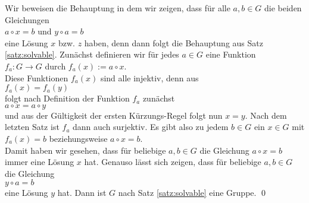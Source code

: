 \proof Wir beweisen die Behauptung in dem wir zeigen, dass für alle $a,b \in G$ die beiden Gleichungen
\\[0.2cm]
\hspace*{1.3cm} $a \circ x = b$ \quad und \quad $y \circ a = b$
\\[0.2cm]
eine Lösung $x$ bzw. $z$ haben, denn dann folgt die Behauptung aus Satz \ref{satz:solvable}.  Zunächst definieren wir für
jedes $a \in G$ eine Funktion
\\[0.2cm]
\hspace*{1.3cm} $f_a: G \rightarrow G$ \quad durch \quad $f_a(x) := a \circ x$.
\\[0.2cm]
Diese Funktionen $f_a(x)$ sind alle injektiv, denn aus
\\[0.2cm]
\hspace*{1.3cm} $f_a(x) = f_a(y)$
\\[0.2cm]
folgt nach Definition der Funktion $f_a$ zunächst
\\[0.2cm]
\hspace*{1.3cm} $a \circ x = a \circ y$
\\[0.2cm]
und aus der Gültigkeit der ersten Kürzungs-Regel folgt nun $x = y$.  Nach dem letzten Satz ist $f_a$ dann
auch surjektiv.  Es gibt also zu jedem $b \in G$ ein $x \in G$ mit
\\[0.2cm]
\hspace*{1.3cm} $f_a(x) = b$ \quad beziehungsweise \quad $a \circ x = b$.
\\[0.2cm]
Damit haben wir gesehen, dass für beliebige $a,b \in G$ die Gleichung $a \circ x = b$ immer eine Lösung
$x$ hat.  Genauso lässt sich  zeigen, dass für beliebige $a,b \in G$ die Gleichung
\\[0.2cm]
\hspace*{1.3cm}
$y \circ a = b$
\\[0.2cm]
eine Lösung $y$ hat.  Dann ist $G$ nach Satz \ref{satz:solvable} eine Gruppe. \qed

